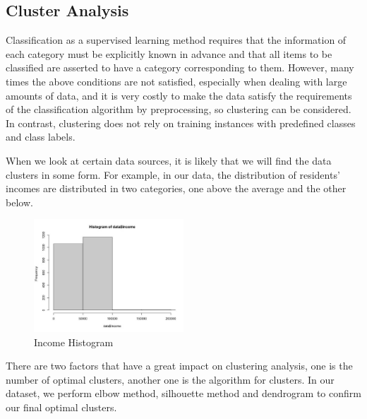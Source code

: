 \documentclass[11pt]{article} %
\begin{document}
\subsection{Cluster Analysis}

\quad Classification as a supervised learning method requires that the information of each category must be explicitly known in advance and that all items to be classified are asserted to have a category corresponding to them. However, many times the above conditions are not satisfied, especially when dealing with large amounts of data, and it is very costly to make the data satisfy the requirements of the classification algorithm by preprocessing, so clustering can be considered. In contrast, clustering does not rely on training instances with predefined classes and class labels.

\quad When we look at certain data sources, it is likely that we will find the data clusters in some form. For example, in our data, the distribution of residents' incomes are distributed in two categories, one above the average and the other below. 

\begin{figure}[H]
    \centering
    \includegraphics[width=0.5\textwidth]{Pengju/p-t-1.jpg}
    \caption{Income Histogram}
    \label{fig:foobar}
\end{figure}

\quad There are two factors that have a great impact on clustering analysis, one is the number of optimal clusters, another one is the algorithm for clusters. In our dataset, we perform elbow method, silhouette method and dendrogram to confirm our final optimal clusters.
\end{document}
